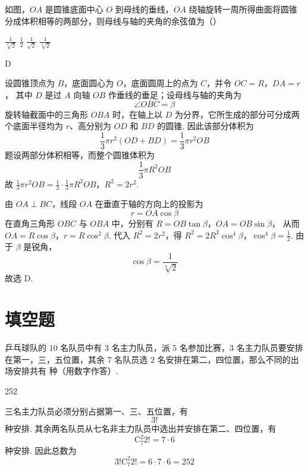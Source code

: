 \begin{problem}
如图，\(OA\) 是圆锥底面中心 \(O\) 到母线的垂线，\(OA\) 绕轴旋转一周所得曲面将圆锥分成体积相等的两部分，则母线与轴的夹角的余弦值为（\quad）


\choices
    {\(\frac{1}{\sqrt[3]{2}}\)}
    {\(\frac{1}{2}\)}
    {\(\frac{1}{\sqrt{2}}\)}
    {\(\frac{1}{\sqrt[4]{2}}\)}
\end{problem}

\begin{answer}
D
\end{answer}

\begin{solution}
设圆锥顶点为 \(B\)，底面圆心为 \(O\)，底面圆周上的点为 \(C\)，并令
\(OC=R\)，\(DA=r\)，
其中 \(D\) 是过 \(A\) 向轴 \(OB\) 作垂线的垂足；设母线与轴的夹角为
\[
\angle OBC=\beta
\]
旋转轴截面中的三角形 \(OBA\) 时，在轴上以 \(D\) 为分界，它所生成的部分可分成两个底面半径均为 \(r\)、高分别为 \(OD\) 和 \(BD\) 的圆锥. 因此该部分体积为
\[
\frac13\pi r^2(OD+BD)=\frac13\pi r^2OB
\]
题设两部分体积相等，而整个圆锥体积为
\[
\frac13\pi R^2OB
\]
故
\(\frac13\pi r^2OB=\frac12\cdot\frac13\pi R^2OB\)，\(R^2=2r^2\).

由 \(OA\perp BC\)，线段 \(OA\) 在垂直于轴的方向上的投影为
\[
r=OA\cos\beta
\]
在直角三角形 \(OBC\) 与 \(OBA\) 中，分别有
\(R=OB\tan\beta\)，\(OA=OB\sin\beta\)，
从而
\(OA=R\cos\beta\)，\(r=R\cos^2\beta\).
代入 \(R^2=2r^2\)，得
\(R^2=2R^2\cos^4\beta\)，\(\cos^4\beta=\frac12\).
由于 \(\beta\) 是锐角，
\[
\cos\beta=\frac1{\sqrt[4]{2}}
\]
故选 D.
\end{solution}

\section{填空题}
\begin{problem}
乒乓球队的 \(10\) 名队员中有 \(3\) 名主力队员，派 \(5\) 名参加比赛，\(3\) 名主力队员要安排在第一，三，五位置，其余 \(7\) 名队员选 \(2\) 名安排在第二，四位置，那么不同的出场安排共有\fillinblank{} 种（用数字作答）.
\end{problem}

\begin{answer}
252
\end{answer}

\begin{solution}
三名主力队员必须分别占据第一、三、五位置，有
\[
3!
\]
种安排. 其余两名队员从七名非主力队员中选出并安排在第二、四位置，有
\[
\mathrm C_7^2 2!=7\cdot6
\]
种安排. 因此总数为
\[
3!\mathrm C_7^2 2!=6\cdot7\cdot6=252
\]
\end{solution}

